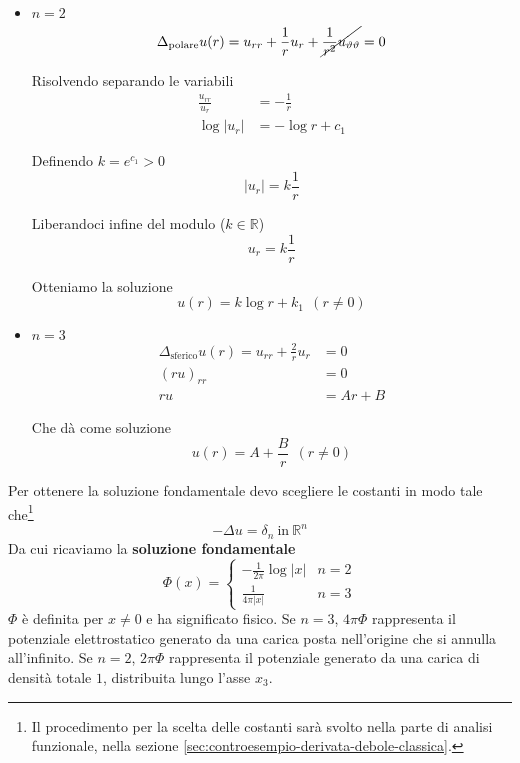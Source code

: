 \documentclass[10pt,a4paper,twoside,openright]{book}
\begin{document}
\begin{itemize}
	\item $\displaystyle n=2$\begin{equation*}
	      \Delta _{\text{polare}} u(r) =u_{rr} +\frac{1}{r} u_{r} +\cancel{\frac{1}{r^{2}} u_{\vartheta \vartheta }} =0
	\end{equation*}
	
	Risolvendo separando le variabili\begin{align*}
	\frac{u_{rr}}{u_{r}} & =-\frac{1}{r}\\
	\log| u_{r}|  & =-\log r+c_{1}
	\end{align*}
	
	Definendo $\displaystyle k=e^{c_{1}}  >0$\begin{equation*}
	| u_{r}| =k\frac{1}{r}
	\end{equation*}
	
	Liberandoci infine del modulo ($\displaystyle k\in \mathbb{R}$)\begin{equation*}
	u_{r} =k\frac{1}{r}
	\end{equation*}
	
	Otteniamo la soluzione\begin{equation*}
	\boxed{u(r) =k\log r+k_{1}} \ \ (r\neq 0)
	\end{equation*}
	\item $\displaystyle n=3$\begin{align*}
	      \Delta _{\text{sferico}} u(r) =u_{rr} +\frac{2}{r} u_{r} & =0\\
	      (ru)_{rr} & =0\\
	      ru & =Ar+B
	\end{align*}
	
	Che dà come soluzione\begin{equation*}
	\boxed{u(r) =A+\frac{B}{r}} \ \ (r\neq 0)
	\end{equation*}
\end{itemize}

Per ottenere la soluzione fondamentale devo scegliere le costanti in modo tale che\footnote{Il procedimento per la scelta delle costanti sarà svolto nella parte di analisi funzionale, nella sezione \ref{sec:controesempio-derivata-debole-classica}.}
\begin{equation*}
	-\Delta u=\delta _{n} \ \text{in} \ \mathbb{R}^{n}
\end{equation*}
Da cui ricaviamo la \textbf{soluzione fondamentale}
\begin{equation}
	\boxed{\Phi (x) =\begin{cases}
	-\frac{1}{2\pi }\log| x|  & n=2\\
	\frac{1}{4\pi | x| } & n=3
	\end{cases}}
\end{equation}
$\displaystyle \Phi $ è definita per $\displaystyle x\neq 0$ e ha significato fisico. Se $\displaystyle n=3$, $\displaystyle 4\pi \Phi $ rappresenta il potenziale elettrostatico generato da una carica posta nell'origine che si annulla all'infinito. Se $\displaystyle n=2$, $\displaystyle 2\pi \Phi $ rappresenta il potenziale generato da una carica di densità totale $\displaystyle 1$, distribuita lungo l'asse $\displaystyle x_{3}$.
\end{document}
